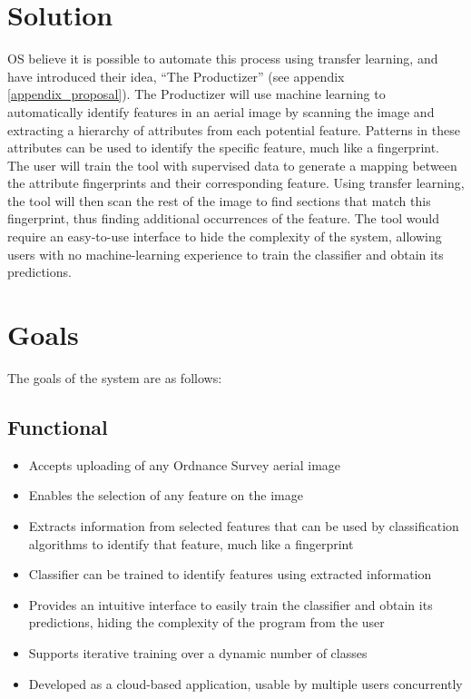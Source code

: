 \section{Solution}
OS believe it is possible to automate this process using transfer learning, and have introduced their idea, ``The Productizer'' (see appendix \ref{appendix_proposal}). 
The Productizer will use machine learning to automatically identify features in an aerial image by scanning the image and extracting a hierarchy of attributes from each potential feature. Patterns in these attributes can be used to identify the specific feature, much like a fingerprint. The user will train the tool with supervised data to generate a mapping between the attribute fingerprints and their corresponding feature. 
Using transfer learning, the tool will then scan the rest of the image to find sections that match this fingerprint, thus finding additional occurrences of the feature. The tool would require an easy-to-use interface to hide the complexity of the system, allowing users with no machine-learning experience to train the classifier and obtain its predictions.

\section{Goals}
The goals of the system are as follows:
\subsection{Functional}
\begin{itemize}
    \item Accepts uploading of any Ordnance Survey aerial image
    \item Enables the selection of any feature on the image
    \item Extracts information from selected features that can be used by classification algorithms to identify that feature, much like a fingerprint
    \item Classifier can be trained to identify features using extracted information 
    \item Provides an intuitive interface to easily train the classifier and obtain its predictions, hiding the complexity of the program from the user
    \item Supports iterative training over a dynamic number of classes
    \item Developed as a cloud-based application, usable by multiple users concurrently
\end{itemize}
